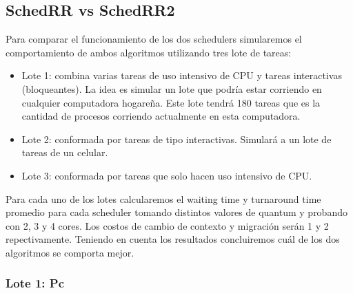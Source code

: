 \subsection{SchedRR vs SchedRR2}

Para comparar el funcionamiento de los dos schedulers simularemos el comportamiento de ambos algoritmos utilizando tres lote de tareas:
\begin{itemize}
	\item Lote 1: combina varias tareas de uso intensivo de CPU y tareas interactivas (bloqueantes). La idea es simular un lote que podría estar corriendo en cualquier computadora hogareña. Este lote tendrá 180 tareas que es la cantidad de procesos corriendo actualmente en esta computadora.
	\item Lote 2: conformada por tareas de tipo interactivas. Simulará a un lote de tareas de un celular.
	\item Lote 3: conformada por tareas que solo hacen uso intensivo de CPU.
\end{itemize}
Para cada uno de los lotes calcularemos el waiting time y turnaround time promedio para cada scheduler tomando distintos valores de quantum y probando con 2, 3 y 4 cores. Los costos de cambio de contexto y migración serán 1 y 2 repectivamente. Teniendo en cuenta los resultados concluiremos cuál de los dos algoritmos se comporta mejor.

\subsubsection{Lote 1: Pc}

